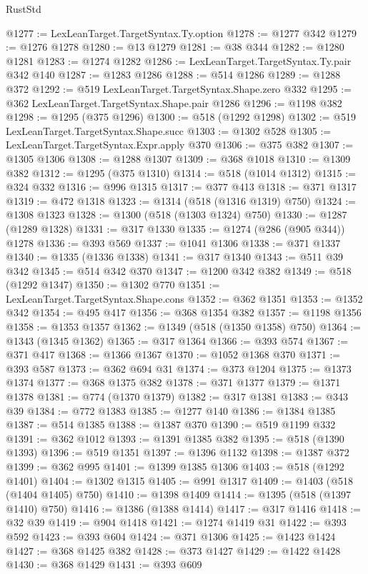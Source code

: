 \begin{lexlean}{RustStd}
\begin{coremodule}
{\begin{coremodule}
{{{{{{{{{{{{{{{{{{{{{{{{{{{{{{{{{{{{{{{{{{{{{{{{{{@1277 := LexLeanTarget.TargetSyntax.Ty.option
@1278 := @1277 @342
@1279 := @1276 @1278
@1280 := @13 @1279
@1281 := @38 @344
@1282 := @1280 @1281
@1283 := @1274 @1282
@1286 := LexLeanTarget.TargetSyntax.Ty.pair @342 @140
@1287 := @1283 @1286
@1288 := @514 @1286
@1289 := @1288 @372
@1292 := @519 LexLeanTarget.TargetSyntax.Shape.zero @332
@1295 := @362 LexLeanTarget.TargetSyntax.Shape.pair @1286
@1296 := @1198 @382
@1298 := @1295 (@375 @1296)
@1300 := @518 (@1292 @1298)
@1302 := @519 LexLeanTarget.TargetSyntax.Shape.succ
@1303 := @1302 @528
@1305 := LexLeanTarget.TargetSyntax.Expr.apply @370
@1306 := @375 @382
@1307 := @1305 @1306
@1308 := @1288 @1307
@1309 := @368 @1018
@1310 := @1309 @382
@1312 := @1295 (@375 @1310)
@1314 := @518 (@1014 @1312)
@1315 := @324 @332
@1316 := @996 @1315
@1317 := @377 @413
@1318 := @371 @1317
@1319 := @472 @1318
@1323 := @1314 (@518 (@1316 @1319) @750)
@1324 := @1308 @1323
@1328 := @1300 (@518 (@1303 @1324) @750)
@1330 := @1287 (@1289 @1328)
@1331 := @317 @1330
@1335 := @1274 (@286 (@905 @344)) @1278
@1336 := @393 @569
@1337 := @1041 @1306
@1338 := @371 @1337
@1340 := @1335 (@1336 @1338)
@1341 := @317 @1340
@1343 := @511 @39 @342
@1345 := @514 @342 @370
@1347 := @1200 @342 @382
@1349 := @518 (@1292 @1347)
@1350 := @1302 @770
@1351 := LexLeanTarget.TargetSyntax.Shape.cons
@1352 := @362 @1351
@1353 := @1352 @342
@1354 := @495 @417
@1356 := @368 @1354 @382
@1357 := @1198 @1356
@1358 := @1353 @1357
@1362 := @1349 (@518 (@1350 @1358) @750)
@1364 := @1343 (@1345 @1362)
@1365 := @317 @1364
@1366 := @393 @574
@1367 := @371 @417
@1368 := @1366 @1367
@1370 := @1052 @1368 @370
@1371 := @393 @587
@1373 := @362 @694 @31
@1374 := @373 @1204
@1375 := @1373 @1374
@1377 := @368 @1375 @382
@1378 := @371 @1377
@1379 := @1371 @1378
@1381 := @774 (@1370 @1379)
@1382 := @317 @1381
@1383 := @343 @39
@1384 := @772 @1383
@1385 := @1277 @140
@1386 := @1384 @1385
@1387 := @514 @1385
@1388 := @1387 @370
@1390 := @519 @1199 @332
@1391 := @362 @1012
@1393 := @1391 @1385 @382
@1395 := @518 (@1390 @1393)
@1396 := @519 @1351
@1397 := @1396 @1132
@1398 := @1387 @372
@1399 := @362 @995
@1401 := @1399 @1385 @1306
@1403 := @518 (@1292 @1401)
@1404 := @1302 @1315
@1405 := @991 @1317
@1409 := @1403 (@518 (@1404 @1405) @750)
@1410 := @1398 @1409
@1414 := @1395 (@518 (@1397 @1410) @750)
@1416 := @1386 (@1388 @1414)
@1417 := @317 @1416
@1418 := @32 @39
@1419 := @904 @1418
@1421 := @1274 @1419 @31
@1422 := @393 @592
@1423 := @393 @604
@1424 := @371 @1306
@1425 := @1423 @1424
@1427 := @368 @1425 @382
@1428 := @373 @1427
@1429 := @1422 @1428
@1430 := @368 @1429
@1431 := @393 @609
}}}}}}}}}}}}}}}}}}}}}}}}}}}}}}}}}}}}}}}}}}}}}}}}}}
\end{coremodule}}
\end{coremodule}
\end{lexlean}
